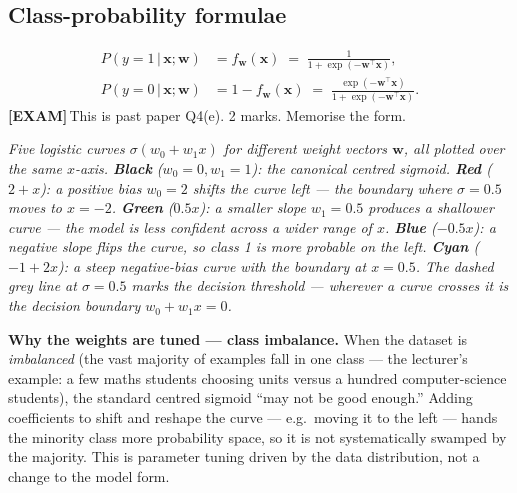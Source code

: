 \documentclass[11pt, a4paper]{article}
\newcommand{\examflag}{\textcolor{tipBd}{\textbf{[EXAM]}}\,}
\begin{document}
\subsection{Class-probability formulae}

\begin{align}
P(y=1\,|\,\mathbf{x};\mathbf{w}) &= f_\mathbf{w}(\mathbf{x}) \;=\; \frac{1}{1+\exp(-\mathbf{w}^\top\mathbf{x})}, \\
P(y=0\,|\,\mathbf{x};\mathbf{w}) &= 1 - f_\mathbf{w}(\mathbf{x}) \;=\; \frac{\exp(-\mathbf{w}^\top\mathbf{x})}{1+\exp(-\mathbf{w}^\top\mathbf{x})}.
\end{align}
\examflag{}This is past paper Q4(e). 2 marks. Memorise the form.

\begin{center}

\footnotesize\textit{Five logistic curves $\sigma(w_0 + w_1 x)$ for different weight vectors $\mathbf{w}$, all plotted over the same $x$-axis. \textbf{Black} ($w_0=0, w_1=1$): the canonical centred sigmoid. \textbf{Red} ($2+x$): a positive bias $w_0=2$ shifts the curve \emph{left} --- the boundary where $\sigma = 0.5$ moves to $x = -2$. \textbf{Green} ($0.5x$): a smaller slope $w_1=0.5$ produces a \emph{shallower} curve --- the model is less confident across a wider range of $x$. \textbf{Blue} ($-0.5x$): a negative slope \emph{flips} the curve, so class 1 is more probable on the left. \textbf{Cyan} ($-1+2x$): a steep negative-bias curve with the boundary at $x = 0.5$. The dashed grey line at $\sigma = 0.5$ marks the decision threshold --- wherever a curve crosses it is the decision boundary $w_0 + w_1 x = 0$.}
\end{center}

\textbf{Why the weights are tuned — class imbalance.} When the dataset is \emph{imbalanced} (the vast majority of examples fall in one class — the lecturer's example: a few maths students choosing units versus a hundred computer-science students), the standard centred sigmoid ``may not be good enough.'' Adding coefficients to shift and reshape the curve — e.g.\ moving it to the left — hands the minority class more probability space, so it is not systematically swamped by the majority. This is parameter tuning driven by the data distribution, not a change to the model form.
\end{document}
